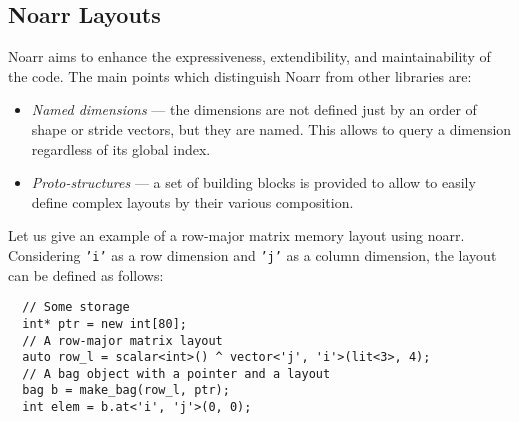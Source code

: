 

\subsection{Noarr Layouts}

Noarr aims to enhance the expressiveness, extendibility, and maintainability of the code. The main points which distinguish Noarr from other libraries are:

\begin{itemize}
  \item \emph{Named dimensions} --- the dimensions are not defined just by an order of shape or stride vectors, but they are named. This allows to query a dimension regardless of its global index.
  \item \emph{Proto-structures} --- a set of building blocks is provided to allow to easily define complex layouts by their various composition.
\end{itemize}

Let us give an example of a row-major matrix memory layout using noarr. Considering \texttt{'i'} as a row dimension and \texttt{'j'} as a column dimension, the layout can be defined as follows:

\begin{verbatim}
  // Some storage
  int* ptr = new int[80];
  // A row-major matrix layout
  auto row_l = scalar<int>() ^ vector<'j', 'i'>(lit<3>, 4);
  // A bag object with a pointer and a layout
  bag b = make_bag(row_l, ptr);
  int elem = b.at<'i', 'j'>(0, 0);
\end{verbatim}

